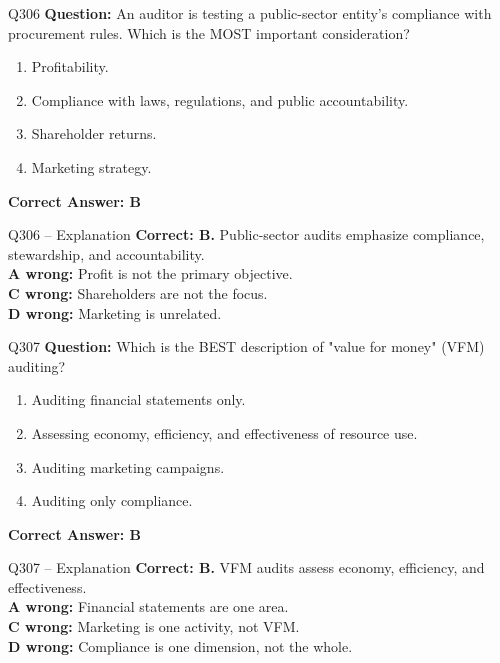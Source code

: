 \documentclass[aspectratio=169,10pt]{beamer}
\begin{document}
	\begin{frame}[t]{Q306}
		\small
		\textbf{Question:} An auditor is testing a public-sector entity's compliance with procurement rules. Which is the MOST important consideration?
		\begin{enumerate}[label=\Alph*.,itemsep=1pt,topsep=2pt]
			\item Profitability.
			\item Compliance with laws, regulations, and public accountability.
			\item Shareholder returns.
			\item Marketing strategy.
		\end{enumerate}
		\vspace{4pt}
		\textbf{Correct Answer: B}
	\end{frame}
	
	\begin{frame}[t]{Q306 -- Explanation}
		\small
		\textbf{Correct: B.} Public-sector audits emphasize compliance, stewardship, and accountability. \\[4pt]
		\textbf{A wrong:} Profit is not the primary objective. \\[2pt]
		\textbf{C wrong:} Shareholders are not the focus. \\[2pt]
		\textbf{D wrong:} Marketing is unrelated.
	\end{frame}
	
	\begin{frame}[t]{Q307}
		\small
		\textbf{Question:} Which is the BEST description of "value for money" (VFM) auditing?
		\begin{enumerate}[label=\Alph*.,itemsep=1pt,topsep=2pt]
			\item Auditing financial statements only.
			\item Assessing economy, efficiency, and effectiveness of resource use.
			\item Auditing marketing campaigns.
			\item Auditing only compliance.
		\end{enumerate}
		\vspace{4pt}
		\textbf{Correct Answer: B}
	\end{frame}
	
	\begin{frame}[t]{Q307 -- Explanation}
		\small
		\textbf{Correct: B.} VFM audits assess economy, efficiency, and effectiveness. \\[4pt]
		\textbf{A wrong:} Financial statements are one area. \\[2pt]
		\textbf{C wrong:} Marketing is one activity, not VFM. \\[2pt]
		\textbf{D wrong:} Compliance is one dimension, not the whole.
	\end{frame}
	
\end{document}
